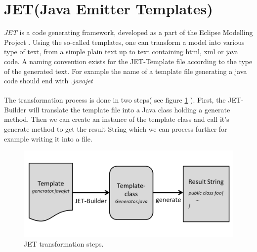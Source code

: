 \section{JET(Java Emitter Templates)}
\textit{JET}\cite{JETWEB} is a code generating framework, developed as a part of the Eclipse Modelling Project \cite{EMPWEB}. Using the so-called templates, one can transform a model into various type of text, from a simple plain text up to text containing html, xml or java code. A naming convention exists for the JET-Template file according to the type of the generated text. For example the name of a template file generating a java code should end with \textit{.javajet}\\\\
The transformation process is done in two steps( see figure \ref{fig:jet_process} ). First, the JET-Builder will translate the template file into a Java class holding a generate method. Then we can create an instance of the template class and call it's generate method to get the result String which we can process further for example writing it into a file. 
\begin{figure}[h]
  \label{fig:jet_process}
	\centering
		\includegraphics[width=1.0\textwidth]{images/jet_process.png}
	\caption{JET transformation steps.}
\end{figure}\\

